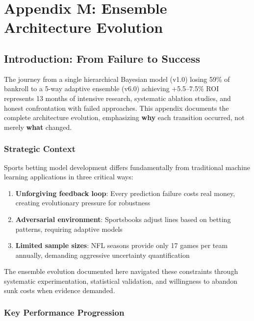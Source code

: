 \chapter{Appendix M: Ensemble Architecture Evolution}
\label{app:architecture-evolution}

\section{Introduction: From Failure to Success}

The journey from a single hierarchical Bayesian model (v1.0) losing 59\% of bankroll to a 5-way adaptive ensemble (v6.0) achieving +5.5--7.5\% ROI represents 13 months of intensive research, systematic ablation studies, and honest confrontation with failed approaches. This appendix documents the complete architecture evolution, emphasizing \textbf{why} each transition occurred, not merely \textbf{what} changed.

\subsection{Strategic Context}

Sports betting model development differs fundamentally from traditional machine learning applications in three critical ways:

\begin{enumerate}
\item \textbf{Unforgiving feedback loop}: Every prediction failure costs real money, creating evolutionary pressure for robustness
\item \textbf{Adversarial environment}: Sportsbooks adjust lines based on betting patterns, requiring adaptive models
\item \textbf{Limited sample sizes}: NFL seasons provide only 17 games per team annually, demanding aggressive uncertainty quantification
\end{enumerate}

The ensemble evolution documented here navigated these constraints through systematic experimentation, statistical validation, and willingness to abandon sunk costs when evidence demanded.

\subsection{Key Performance Progression}



